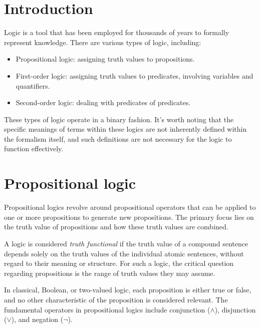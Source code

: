 \documentclass[12pt, a4paper]{report}
\begin{document}
    \section{Introduction}
    Logic is a tool that has been employed for thousands of years to formally represent knowledge. There are various types of logic, including:
    \begin{itemize}
        \item Propositional logic: assigning truth values to propositions.
        \item First-order logic: assigning truth values to predicates, involving variables and quantifiers.
        \item Second-order logic: dealing with predicates of predicates.
    \end{itemize}
    These types of logic operate in a binary fashion. 
    It's worth noting that the specific meanings of terms within these logics are not inherently defined within the formalism itself, and such definitions are not necessary for the logic to function effectively.

    \section{Propositional logic}
    Propositional logics revolve around propositional operators that can be applied to one or more propositions to generate new propositions. 
    The primary focus lies on the truth value of propositions and how these truth values are combined.
    \begin{definition}
        A logic is considered \emph{truth functional} if the truth value of a compound sentence depends solely on the truth values of the individual atomic sentences, without regard to their meaning or structure. 
        For such a logic, the critical question regarding propositions is the range of truth values they may assume.
    \end{definition}
    In classical, Boolean, or two-valued logic, each proposition is either true or false, and no other characteristic of the proposition is considered relevant.
    The fundamental operators in propositional logics include conjunction ($\land$), disjunction ($\lor$), and negation ($\lnot$).
\end{document}
